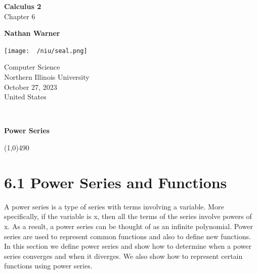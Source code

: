 \documentclass{report}
\title{\Huge{}}
\author{\huge{Nathan Warner}}
\date{\huge{}}
\begin{document}
        \begin{titlepage}
       \begin{center}
           \vspace*{1cm}
    
           \textbf{Calculus 2} \\
           Chapter 6
    
           \vspace{0.5cm}
            
                
           \vspace{1.5cm}
    
           \textbf{Nathan Warner}
    
           \vfill
                
                
           \vspace{0.8cm}
         
           \texttt{[image: ~/niu/seal.png]}
                
           Computer Science \\
           Northern Illinois University\\
           October 27, 2023 \\
           United States\\
           
                
       \end{center}
    \end{titlepage}
    \tableofcontents
    \pagebreak \bigbreak \noindent
    \vspace{2in} \\
    \begin{Huge}
       \textbf{Power Series} 
    \end{Huge}
    \bigbreak \noindent 
    \line(1,0){490}
    \bigbreak \noindent 
    \section*{6.1 Power Series and Functions}
    \bigbreak \noindent 
    A power series is a type of series with terms involving a variable. More specifically, if the variable is x, then all the terms of the series involve powers of x. As a result, a power series can be thought of as an infinite polynomial. Power series are used to represent common functions and also to define new functions. In this section we define power series and show how to determine when a power series converges and when it diverges. We also show how to represent certain functions using power series.
    \bigbreak \noindent 
\end{document}
